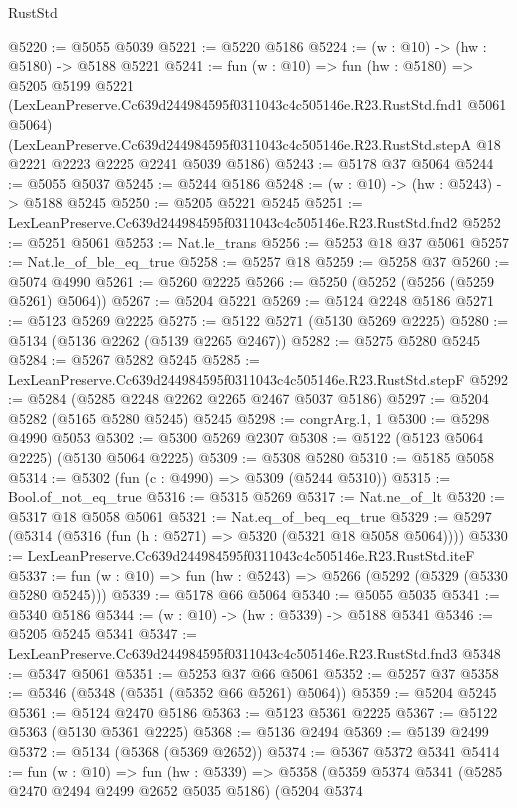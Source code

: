 \begin{lexlean}{RustStd}
\begin{coremodule}
@5220 := @5055 @5039
@5221 := @5220 @5186
@5224 := (w : @10) -> (hw : @5180) -> @5188 @5221
@5241 := fun (w : @10) =>
  fun (hw : @5180) =>
  @5205
    @5199
    @5221
    (LexLeanPreserve.Cc639d244984595f0311043c4c505146e.R23.RustStd.fnd1 @5061 @5064)
    (LexLeanPreserve.Cc639d244984595f0311043c4c505146e.R23.RustStd.stepA
      @18
      @2221
      @2223
      @2225
      @2241
      @5039
      @5186)
@5243 := @5178 @37 @5064
@5244 := @5055 @5037
@5245 := @5244 @5186
@5248 := (w : @10) -> (hw : @5243) -> @5188 @5245
@5250 := @5205 @5221 @5245
@5251 := LexLeanPreserve.Cc639d244984595f0311043c4c505146e.R23.RustStd.fnd2
@5252 := @5251 @5061
@5253 := Nat.le_trans
@5256 := @5253 @18 @37 @5061
@5257 := Nat.le_of_ble_eq_true
@5258 := @5257 @18
@5259 := @5258 @37
@5260 := @5074 @4990
@5261 := @5260 @2225
@5266 := @5250 (@5252 (@5256 (@5259 @5261) @5064))
@5267 := @5204 @5221
@5269 := @5124 @2248 @5186
@5271 := @5123 @5269 @2225
@5275 := @5122 @5271 (@5130 @5269 @2225)
@5280 := @5134 (@5136 @2262 (@5139 @2265 @2467))
@5282 := @5275 @5280 @5245
@5284 := @5267 @5282 @5245
@5285 := LexLeanPreserve.Cc639d244984595f0311043c4c505146e.R23.RustStd.stepF
@5292 := @5284 (@5285 @2248 @2262 @2265 @2467 @5037 @5186)
@5297 := @5204 @5282 (@5165 @5280 @5245) @5245
@5298 := congrArg.{1, 1}
@5300 := @5298 @4990 @5053
@5302 := @5300 @5269 @2307
@5308 := @5122 (@5123 @5064 @2225) (@5130 @5064 @2225)
@5309 := @5308 @5280
@5310 := @5185 @5058
@5314 := @5302 (fun (c : @4990) => @5309 (@5244 @5310))
@5315 := Bool.of_not_eq_true
@5316 := @5315 @5269
@5317 := Nat.ne_of_lt
@5320 := @5317 @18 @5058 @5061
@5321 := Nat.eq_of_beq_eq_true
@5329 := @5297 (@5314 (@5316 (fun (h : @5271) => @5320 (@5321 @18 @5058 @5064))))
@5330 := LexLeanPreserve.Cc639d244984595f0311043c4c505146e.R23.RustStd.iteF
@5337 := fun (w : @10) => fun (hw : @5243) => @5266 (@5292 (@5329 (@5330 @5280 @5245)))
@5339 := @5178 @66 @5064
@5340 := @5055 @5035
@5341 := @5340 @5186
@5344 := (w : @10) -> (hw : @5339) -> @5188 @5341
@5346 := @5205 @5245 @5341
@5347 := LexLeanPreserve.Cc639d244984595f0311043c4c505146e.R23.RustStd.fnd3
@5348 := @5347 @5061
@5351 := @5253 @37 @66 @5061
@5352 := @5257 @37
@5358 := @5346 (@5348 (@5351 (@5352 @66 @5261) @5064))
@5359 := @5204 @5245
@5361 := @5124 @2470 @5186
@5363 := @5123 @5361 @2225
@5367 := @5122 @5363 (@5130 @5361 @2225)
@5368 := @5136 @2494
@5369 := @5139 @2499
@5372 := @5134 (@5368 (@5369 @2652))
@5374 := @5367 @5372 @5341
@5414 := fun (w : @10) =>
  fun (hw : @5339) =>
  @5358
    (@5359
      @5374
      @5341
      (@5285 @2470 @2494 @2499 @2652 @5035 @5186)
      (@5204
        @5374

\end{coremodule}
\end{lexlean}
